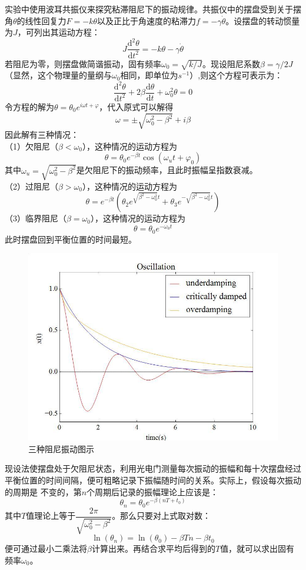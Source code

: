 \documentclass[11pt,a4paper,UTF8]{ctexart}
\begin{document}
实验中使用波耳共振仪来探究粘滞阻尼下的振动规律。共振仪中的摆盘受到关于摆角$\theta$的线性回复力$F=-k\theta$以及正比于角速度的粘滞力$f=-\gamma\dot{\theta}$。设摆盘的转动惯量为$J$，可列出其运动方程：
	\[J\frac{\mathrm{d}^2 \theta}{\mathrm{d}t^2}=-k\theta-\gamma\dot{\theta}\tag{1}\]
若阻尼为零，则摆盘做简谐振动，固有频率$\omega_0=\sqrt{k/J}$。现设阻尼系数$\beta=\gamma/2J$（显然，这个物理量的量纲与$\omega_0$相同，即单位为$s^{-1}$）,则这个方程可表示为：
	\[\frac{\mathrm{d}^{2} \theta}{\mathrm{d} t^{2}}+2 \beta \frac{\mathrm{d} \theta}{\mathrm{d} t}+\omega_{0}^{2} \theta=0\tag{2}\]
令方程的解为$\theta=\theta_0 e^{i\omega t+\varphi}$，代入原式可以解得
	\[\omega=\pm\sqrt{\omega_0^2-\beta^2}+i\beta\tag{3}\]
因此解有三种情况：
\\（1）欠阻尼（$\beta<\omega_0$），这种情况的运动方程为
	\[\theta=\theta_{0} e^{-\beta t} \cos \left(\omega_{u} t+\varphi_{0}\right)\tag{4}\]
其中$\omega_u=\sqrt{\omega_0^2-\beta^2}$是欠阻尼下的振动频率，且此时振幅呈指数衰减。
\\（2）过阻尼（$\beta>\omega_0$），这种情况的运动方程为
	\[\theta=e^{-\beta t}\left(\theta_{2} e^{\sqrt{\beta^{2}-\omega_{0}^{2}} t}+\theta_{3} e^{-\sqrt{\beta^{2}-\omega_{0}^{2}} t}\right)\tag{5}\]
（3）临界阻尼（$\beta=\omega_0$），这种情况的运动方程为
	\[\theta=\theta_0e^{-\omega_0t}\tag{6}\]
此时摆盘回到平衡位置的时间最短。
\begin{figure}[h]
\centering
\includegraphics[width=.55\linewidth]{阻尼振动.jpg}
\caption{三种阻尼振动图示}
\end{figure}

现设法使摆盘处于欠阻尼状态，利用光电门测量每次振动的振幅和每十次摆盘经过平衡位置的时间间隔，便可粗略记录下振幅随时间的关系。实际上，假设每次振动的周期是
不变的，第$n$个周期后记录的振幅理论上应该是：
	\[\theta_n=\theta_0e^{-\beta(nT+t_0)}\tag{7}\]
其中$T$值理论上等于$\dfrac{2\pi}{\sqrt{\omega_0^2-\beta^2}}$。那么只要对上式取对数：
	\[\ln(\theta_n)=\ln(\theta_0)-\beta Tn-\beta t_0\tag{8}\]
便可通过最小二乘法将$\beta$计算出来。再结合求平均后得到的$T$值，就可以求出固有频率$\omega_0$。
\end{document}
